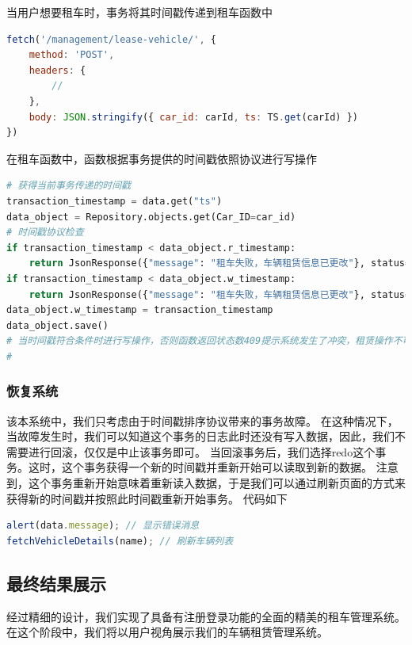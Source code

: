\documentclass[UTF8,a4paper,12pt]{ctexart}
\begin{document}
当用户想要租车时，事务将其时间戳传递到租车函数中
\begin{lstlisting}[language=JavaScript]
fetch('/management/lease-vehicle/', {
    method: 'POST',
    headers: {
        //
    },
    body: JSON.stringify({ car_id: carId, ts: TS.get(carId) })  
})
\end{lstlisting}

在租车函数中，函数根据事务提供的时间戳依照协议进行写操作
\begin{lstlisting}[language=Python]
# 获得当前事务传递的时间戳
transaction_timestamp = data.get("ts")  
data_object = Repository.objects.get(Car_ID=car_id)
# 时间戳协议检查
if transaction_timestamp < data_object.r_timestamp:
    return JsonResponse({"message": "租车失败，车辆租赁信息已更改"}, status=409)
if transaction_timestamp < data_object.w_timestamp:
    return JsonResponse({"message": "租车失败，车辆租赁信息已更改"}, status=409)
data_object.w_timestamp = transaction_timestamp
data_object.save()
# 当时间戳符合条件时进行写操作，否则函数返回状态数409提示系统发生了冲突，租赁操作不可以继续，并中断该操作
#
\end{lstlisting}

\subsubsection{恢复系统}
该本系统中，我们只考虑由于时间戳排序协议带来的事务故障。 在这种情况下，当故障发生时，我们可以知道这个事务的日志此时还没有写入数据，因此，我们不需要进行回滚，仅仅是中止该事务即可。
当回滚事务后，我们选择redo这个事务。这时，这个事务获得一个新的时间戳并重新开始可以读取到新的数据。
注意到，这个事务重新开始意味着重新读入数据，于是我们可以通过刷新页面的方式来获得新的时间戳并按照此时间戳重新开始事务。
代码如下
\begin{lstlisting}[language=JavaScript]
alert(data.message); // 显示错误消息
fetchVehicleDetails(name); // 刷新车辆列表
\end{lstlisting}

\subsection{最终结果展示}
经过精细的设计，我们实现了具备有注册登录功能的全面的精美的租车管理系统。在这个阶段中，我们将以用户视角展示我们的车辆租赁管理系统。
\end{document}
